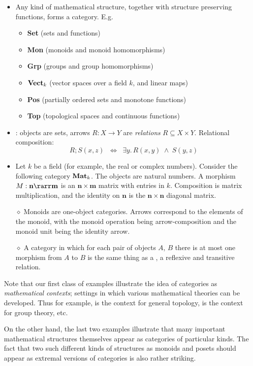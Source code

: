 \documentclass{svmult}
\begin{document}
\begin{itemize}
\item {Any kind of mathematical structure, together with structure preserving functions, forms a category. E.g.}
\begin{itemize}
\item {\textbf{Set} (sets and functions)}
\item {\textbf{Mon} (monoids and monoid homomorphisms)}
\item {\textbf{Grp} (groups and group homomorphisms)}
\item {$\text{\textbf{Vect}}_{k}$ (vector spaces over a field $k$, and linear maps)}
\item {\textbf{Pos} (partially ordered sets and monotone functions)}
\item {\textbf{Top} (topological spaces and continuous functions)}
\end{itemize}
\item \Rel: objects are sets, arrows $R : X \rightarrow Y$ are \emph{relations} $R \subseteq X \times Y$.
Relational composition:
\[ R;S (x, z) \;\; \Longleftrightarrow \;\; \exists y. \, R(x, y) \; \wedge \; S(y, z) \]
\item Let $k$ be a field (for example, the real or complex numbers). Consider the following category $\text{\textbf{Mat}}_{k}$. The objects are natural numbers. A morphism $M : \mathbf{n} \rarr \mathbf{m}$ is an $\mathbf{n} \times \mathbf{m}$ matrix with entries in $k$. Composition is matrix multiplication, and the identity on $\mathbf{n}$ is the $\mathbf{n} \times \mathbf{n}$ diagonal matrix.
\item[$\diamond$] Monoids are one-object categories. Arrows correspond to the elements of the monoid, with the monoid operation being arrow-composition
    and the monoid unit being the identity arrow.
\item[$\diamond$] {A category in which for each pair of objects $A$, $B$ there is at most one morphism from $A$ to $B$ is the same thing as a
  , \ie a reflexive and transitive relation.}
\end{itemize}
Note that our first class of examples illustrate the idea of categories as \emph{mathematical contexts}; settings in which various mathematical theories can be developed. Thus for example,  is the context for general topology,  is the context for group theory, etc.

On the other hand, the last two examples illustrate that many important mathematical structures themselves appear as categories of particular kinds. The fact that two such different kinds of structures as monoids and posets should appear as extremal versions of categories is also rather striking.
\end{document}
